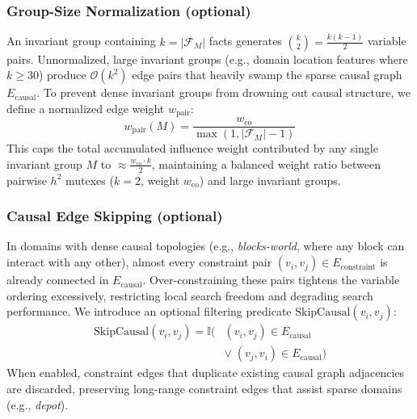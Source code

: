 \documentclass[twocolumn,10pt]{article}
\begin{document}
\subsubsection{Group-Size Normalization (optional)}
\label{sec:groupnorm}
An invariant group containing $k = |\mathcal{F}_M|$ facts generates $\binom{k}{2} = \frac{k(k-1)}{2}$ variable pairs. Unnormalized, large invariant groups (e.g., domain location features where $k \ge 30$) produce $\mathcal{O}(k^2)$ edge pairs that heavily swamp the sparse causal graph $E_{\text{causal}}$. To prevent dense invariant groups from drowning out causal structure, we define a normalized edge weight $w_{\text{pair}}$:
\begin{equation}
    w_{\text{pair}}(M) = \frac{w_{\text{co}}}{\max(1, |\mathcal{F}_M| - 1)}
    \label{eq:group_norm}
\end{equation}
This caps the total accumulated influence weight contributed by any single invariant group $M$ to $\approx \frac{w_{\text{co}} \cdot k}{2}$, maintaining a balanced weight ratio between pairwise $h^2$ mutexes ($k=2$, weight $w_{\text{co}}$) and large invariant groups.

\subsubsection{Causal Edge Skipping (optional)}
\label{sec:skipcausal}
In domains with dense causal topologies (e.g., \textit{blocks-world}, where any block can interact with any other), almost every constraint pair $(v_i, v_j) \in E_{\text{constraint}}$ is already connected in $E_{\text{causal}}$. Over-constraining these pairs tightens the variable ordering excessively, restricting local search freedom and degrading search performance. We introduce an optional filtering predicate $\text{SkipCausal}(v_i, v_j)$:
\begin{equation*}
\begin{aligned}
    \text{SkipCausal}(v_i, v_j) = \mathbb{I}\bigl( &(v_i, v_j) \in E_{\text{causal}} \\
    &\lor\; (v_j, v_i) \in E_{\text{causal}} \bigr)
\end{aligned}
\end{equation*}
When enabled, constraint edges that duplicate existing causal graph adjacencies are discarded, preserving long-range constraint edges that assist sparse domains (e.g., \textit{depot}).
\end{document}
